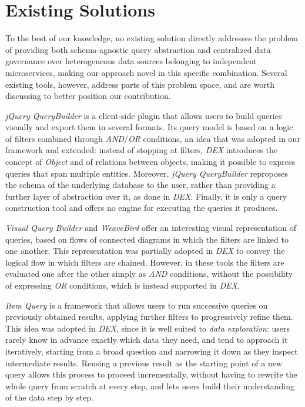 
\section{Existing Solutions}
To the best of our knowledge, no existing solution directly addresses the
problem of providing both schema-agnostic query abstraction and centralized
data governance over heterogeneous data sources belonging to independent
microservices, making our approach novel in this specific combination. Several
existing tools, however, address parts of this problem space, and are worth
discussing to better position our contribution.

\textit{jQuery QueryBuilder} is a client-side plugin that allows users to
build queries visually and export them in several formats. Its query model is
based on a logic of filters combined through \textit{AND}/\textit{OR}
conditions, an idea that was adopted in our framework and extended: instead of
stopping at filters, \textit{DEX} introduces the concept of \textit{Object}
and of relations between objects, making it possible to express queries that
span multiple entities. Moreover, \textit{jQuery QueryBuilder} reproposes the
schema of the underlying database to the user, rather than providing a further
layer of abstraction over it, as done in \textit{DEX}. Finally, it is only a
query construction tool and offers no engine for executing the queries it
produces.

\textit{Visual Query Builder} and \textit{WeaveBird} offer an interesting visual
representation of queries, based on flows of connected diagrams in which the
filters are linked to one another. This representation was partially adopted in
\textit{DEX} to convey the logical flow in which filters are chained.
However, in these tools the filters are evaluated one after the other simply as
\textit{AND} conditions, without the possibility of expressing \textit{OR}
conditions, which is instead supported in \textit{DEX}.

\textit{Item Query} is a framework that allows users to run successive queries
on previously obtained results, applying further filters to progressively
refine them. This idea was adopted in \textit{DEX}, since it is well suited to
\textit{data exploration}: users rarely know in advance exactly which data they
need, and tend to approach it iteratively, starting from a broad question and
narrowing it down as they inspect intermediate results. Reusing a previous
result as the starting point of a new query allows this process to proceed
incrementally, without having to rewrite the whole query from scratch at every
step, and lets users build their understanding of the data step by step.

